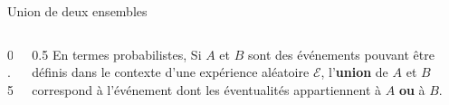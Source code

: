 \documentclass[nuit,charter,pied,handout]{BeamerJS}
\begin{document}
\begin{frame}[c]{Union de deux ensembles}\pause
	\begin{columns}[c]
		\begin{column}{0.5\textwidth}
		\end{column}
		\pause
		\begin{column}{0.5\textwidth}
			En termes probabilistes, Si \(A\) et \(B\) sont des événements pouvant être définis dans le contexte d'une expérience aléatoire $\mathcal{E}$, l'\textbf{union} de \(A\) et \(B\) correspond à l'événement dont les éventualités appartiennent à \(A\) \textbf{ou} à \(B\).
		\end{column}
	\end{columns}
\end{frame}
\end{document}

